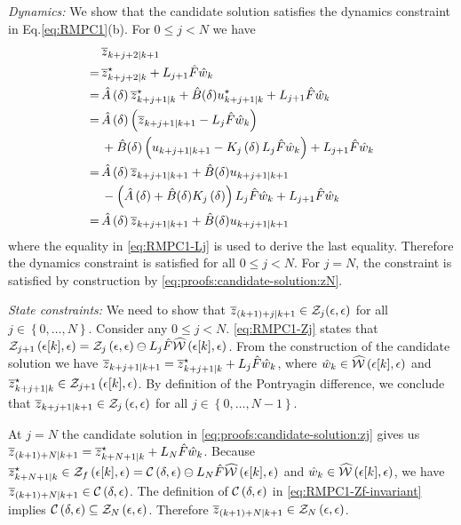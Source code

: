 \noindent\textit{Dynamics:}
%
We show that the candidate solution satisfies the dynamics constraint
in Eq.\eqref{eq:RMPC1}(b). For $0\leq j<N$ we have
\begin{align*}
&\overline{z}_{k+j+2| k+1} \\
=\, & \overline{z}_{k+j+2| k}^{\star}+L_{j+1}\hat{F}\hat{w}_{k}\\
=\, &\hat{A}\left(\delta\right)\overline{z}_{k+j+1| k}^{\star}+\hat{B}(\delta)u_{k+j+1| k}^{\star}+L_{j+1}\hat{F}\hat{w}_{k}\\
=\, &\hat{A}\left(\delta\right)\left(\overline{z}_{k+j+1| k+1}-L_{j}\hat{F}\hat{w}_{k}\right) \\
&+\hat{B}(\delta)\left(u_{k+j+1| k+1}-K_{j}\left(\delta\right)L_{j}\hat{F}\hat{w}_{k}\right) +L_{j+1}\hat{F}\hat{w}_{k} \\
=\, &\hat{A}\left(\delta\right)\overline{z}_{k+j+1| k+1}+\hat{B}(\delta)u_{k+j+1| k+1} \\
&-\left(\hat{A}\left(\delta\right) + \hat{B}(\delta)K_{j}\left(\delta\right)\right)L_{j}\hat{F}\hat{w}_{k}+L_{j+1}\hat{F}\hat{w}_{k}\\
=\, &\hat{A}\left(\delta\right)\overline{z}_{k+j+1| k+1}+\hat{B}(\delta)u_{k+j+1| k+1}
\end{align*}
where the equality in \eqref{eq:RMPC1-Lj} is used to derive the last
equality. %
Therefore the dynamics constraint
is satisfied for all $0\leq j<N$. For $j=N$, the constraint is satisfied
by construction by \eqref{eq:proofs:candidate-solution:zN}.


\noindent\textit{State constraints:}
%
We need to show that $\overline{z}_{(k+1)+j| k+1}\in\mathcal{Z}_{j}\text{\ensuremath{\left(\epsilon,\epsilon\right)}}$
for all $j\in\left\{ 0,\dots,N\right\} $. Consider any $0\leq j<N$.
\eqref{eq:RMPC1-Zj} states that $\mathcal{Z}_{j+1}\left(\epsilon[k],\epsilon\right)=\mathcal{Z}_{j}\left(\epsilon,\epsilon\right)\ominus L_{j}\hat{F}\widehat{\mathcal{W}}\left(\epsilon[k],\epsilon\right)$.
From the construction of the candidate solution we have $\overline{z}_{k+j+1| k+1}=\overline{z}_{k+j+1| k}^{\star}+L_{j}\hat{F}\hat{w}_{k}$,
where $\hat{w}_{k}\in\widehat{\mathcal{W}}\left(\epsilon[k],\epsilon\right)$ and $\overline{z}_{k+j+1| k}^{\star}\in\mathcal{Z}_{j+1}\left(\epsilon[k],\epsilon\right)$.
By definition of the Pontryagin difference, we conclude that $\overline{z}_{k+j+1| k+1}\in\mathcal{Z}_{j}\left(\epsilon,\epsilon\right)$
for all $j\in\left\{ 0,\dots,N-1\right\} $.

At $j=N$ the candidate solution in \eqref{eq:proofs:candidate-solution:zj}
gives us $\overline{z}_{(k+1)+N| k+1}=\overline{z}_{k+N+1| k}^{\star}+L_{N}\hat{F}\hat{w}_{k}$.
Because $\overline{z}_{k+N+1| k}^{\star}\in\mathcal{Z}_{f}\left(\epsilon[k],\epsilon\right)=\mathcal{C}\left(\delta,\epsilon\right)\ominus L_{N}\hat{F}\widehat{\mathcal{W}}\left(\epsilon[k],\epsilon\right)$
and $\hat{w}_{k}\in\widehat{\mathcal{W}}\left(\epsilon[k],\epsilon\right)$, we have
$\overline{z}_{(k+1)+N| k+1}\in\mathcal{C}\left(\delta,\epsilon\right)$. The
definition of $\mathcal{C}\left(\delta,\epsilon\right)$ in \eqref{eq:RMPC1-Zf-invariant}
implies $\mathcal{C}\left(\delta,\epsilon\right)\subseteq\mathcal{Z}_{N}\left(\epsilon,\epsilon\right)$.
Therefore $\overline{z}_{(k+1)+N| k+1}\in\mathcal{Z}_{N}\left(\epsilon,\epsilon\right)$.


